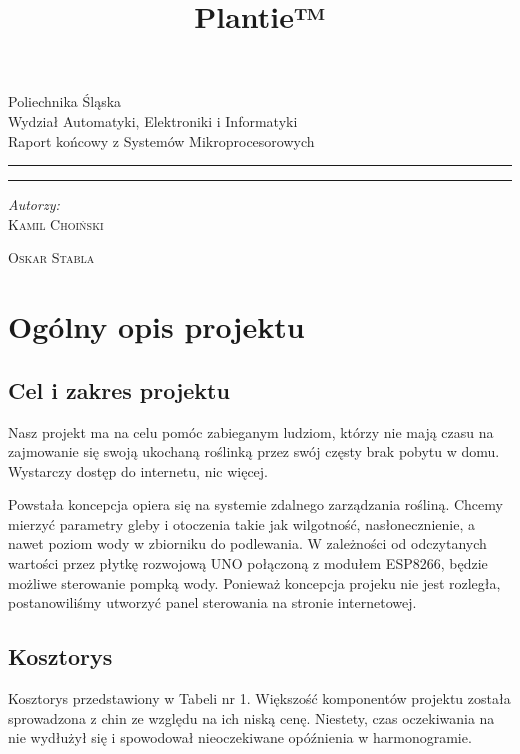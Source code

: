 \documentclass[12pt]{article}
\title{Plantie™}
\makeatletter
\newcommand{\linia}{\rule{\linewidth}{0.4mm}}
\renewcommand{\maketitle}{\begin{titlepage}
		\vspace*{1cm}
		\begin{center}\small
			Poliechnika Śląska\\
			Wydział Automatyki, Elektroniki i Informatyki\\
			Raport końcowy z Systemów Mikroprocesorowych
		\end{center}
		\vspace{3cm}
		\noindent\linia
		\begin{center}
			\LARGE \textsc{\@title}
		\end{center}
		\linia
		\vspace{0.5cm}
		\begin{flushright}
			\begin{minipage}{15cm}
				\textit{\small Autorzy:}\\
				\normalsize \textsc{Kamil Choiński} \par \textsc{Oskar Stabla} \par
			\end{minipage}	
		\end{flushright}
		\vspace*{\stretch{6}}
		\begin{center}
			\@date
		\end{center}
	\end{titlepage}
}
\makeatother
\begin{document}
	
\maketitle

\tableofcontents


\section{Ogólny opis projektu}


\subsection{Cel i zakres projektu}
Nasz projekt ma na celu pomóc zabieganym ludziom, którzy nie mają czasu na zajmowanie się
swoją ukochaną roślinką przez swój częsty brak pobytu w domu. Wystarczy dostęp do internetu,
nic więcej.

Powstała koncepcja opiera się na systemie zdalnego zarządzania rośliną. Chcemy mierzyć parametry
gleby i otoczenia takie jak wilgotność, nasłonecznienie, a nawet poziom wody w zbiorniku do podlewania. W zależności od odczytanych wartości przez
płytkę rozwojową UNO połączoną z modułem ESP8266, będzie możliwe sterowanie pompką wody. Ponieważ koncepcja projeku nie jest rozległa, postanowiliśmy utworzyć panel sterowania na stronie
internetowej.


\subsection{Kosztorys}
Kosztorys przedstawiony w Tabeli nr 1. 
Większość komponentów projektu została sprowadzona z chin ze względu na ich niską cenę. Niestety, czas oczekiwania na nie wydłużył się i spowodował nieoczekiwane opóźnienia w harmonogramie.
\end{document}
